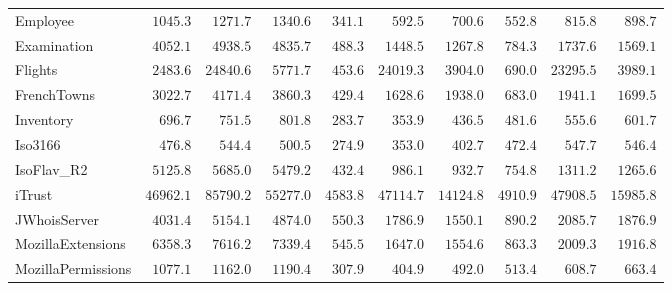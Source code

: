 \documentclass[runningheads,a4paper]{llncs}
\begin{document}
\begin{table}
\begin{center}
{\begin{tabular}{lccc|ccc|ccc}
		Employee  & $\phantom{0}1045.3$ & $\phantom{0}1271.7$ & $\phantom{0}1340.6$ & $\phantom{0}341.1$ & $\phantom{00}592.5$ & $\phantom{00}700.6$ & $\phantom{0}552.8$ & $\phantom{00}815.8$ & $\phantom{00}898.7$ \\
		Examination  & $\phantom{0}4052.1$ & $\phantom{0}4938.5$ & $\phantom{0}4835.7$ & $\phantom{0}488.3$ & $\phantom{0}1448.5$ & $\phantom{0}1267.8$ & $\phantom{0}784.3$ & $\phantom{0}1737.6$ & $\phantom{0}1569.1$ \\
		Flights  & $\phantom{0}2483.6$ & $24840.6$ & $\phantom{0}5771.7$ & $\phantom{0}453.6$ & $24019.3$ & $\phantom{0}3904.0$ & $\phantom{0}690.0$ & $23295.5$ & $\phantom{0}3989.1$ \\
		FrenchTowns  & $\phantom{0}3022.7$ & $\phantom{0}4171.4$ & $\phantom{0}3860.3$ & $\phantom{0}429.4$ & $\phantom{0}1628.6$ & $\phantom{0}1938.0$ & $\phantom{0}683.0$ & $\phantom{0}1941.1$ & $\phantom{0}1699.5$ \\
		Inventory  & $\phantom{00}696.7$ & $\phantom{00}751.5$ & $\phantom{00}801.8$ & $\phantom{0}283.7$ & $\phantom{00}353.9$ & $\phantom{00}436.5$ & $\phantom{0}481.6$ & $\phantom{00}555.6$ & $\phantom{00}601.7$ \\
		Iso3166  & $\phantom{00}476.8$ & $\phantom{00}544.4$ & $\phantom{00}500.5$ & $\phantom{0}274.9$ & $\phantom{00}353.0$ & $\phantom{00}402.7$ & $\phantom{0}472.4$ & $\phantom{00}547.7$ & $\phantom{00}546.4$ \\
		IsoFlav\_R2  & $\phantom{0}5125.8$ & $\phantom{0}5685.0$ & $\phantom{0}5479.2$ & $\phantom{0}432.4$ & $\phantom{00}986.1$ & $\phantom{00}932.7$ & $\phantom{0}754.8$ & $\phantom{0}1311.2$ & $\phantom{0}1265.6$ \\
		iTrust  & $46962.1$ & $85790.2$ & $55277.0$ & $4583.8$ & $47114.7$ & $14124.8$ & $4910.9$ & $47908.5$ & $15985.8$ \\
		JWhoisServer  & $\phantom{0}4031.4$ & $\phantom{0}5154.1$ & $\phantom{0}4874.0$ & $\phantom{0}550.3$ & $\phantom{0}1786.9$ & $\phantom{0}1550.1$ & $\phantom{0}890.2$ & $\phantom{0}2085.7$ & $\phantom{0}1876.9$ \\
		MozillaExtensions  & $\phantom{0}6358.3$ & $\phantom{0}7616.2$ & $\phantom{0}7339.4$ & $\phantom{0}545.5$ & $\phantom{0}1647.0$ & $\phantom{0}1554.6$ & $\phantom{0}863.3$ & $\phantom{0}2009.3$ & $\phantom{0}1916.8$ \\
		MozillaPermissions  & $\phantom{0}1077.1$ & $\phantom{0}1162.0$ & $\phantom{0}1190.4$ & $\phantom{0}307.9$ & $\phantom{00}404.9$ & $\phantom{00}492.0$ & $\phantom{0}513.4$ & $\phantom{00}608.7$ & $\phantom{00}663.4$ \\

\end{tabular}}
\end{center}
\end{table}
\end{document}
